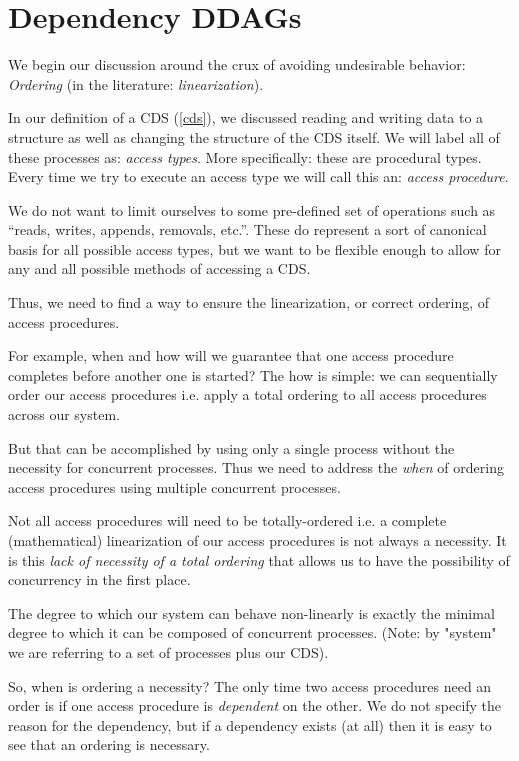 \section{Dependency DDAGs}

We begin our discussion around the crux of avoiding undesirable behavior: \textit{Ordering} (in the literature: \textit{linearization}).

In our definition of a CDS (\ref{cds}), we discussed reading and writing data to a structure as well as changing the structure of the CDS itself. We will label all of these processes as: \textit{access types}. More specifically: these are procedural types. Every time we try to execute an access type we will call this an: \textit{access procedure}.

We do not want to limit ourselves to some pre-defined set of operations such as ``reads, writes, appends, removals, etc.''. These do represent a sort of canonical basis for all possible access types, but we want to be flexible enough to allow for any and all possible methods of accessing a CDS.

Thus, we need to find a way to ensure the linearization, or correct ordering, of access procedures. 

For example, when and how will we guarantee that one access procedure completes before another one is started? The how is simple: we can sequentially order our access procedures i.e. apply a total ordering to all access procedures across our system. 

But that can be accomplished by using only a single process without the necessity for concurrent processes. Thus we need to address the \textit{when} of ordering access procedures using multiple concurrent processes.

Not all access procedures will need to be totally-ordered i.e. a complete (mathematical) linearization of our access procedures is not always a necessity. It is this \textit{lack of necessity of a total ordering} that allows us to have the possibility of concurrency in the first place. 

The degree to which our system can behave non-linearly is exactly the minimal degree to which it can be composed of concurrent processes. (Note: by "system" we are referring to a set of processes plus our CDS).

So, when is ordering a necessity? The only time two access procedures need an order is if one access procedure is \textit{dependent} on the other. We do not specify the reason for the dependency, but if a dependency exists (at all) then it is easy to see that an ordering is necessary.

